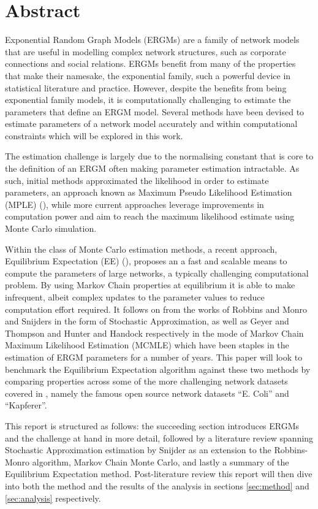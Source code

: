 \section{Abstract}

Exponential Random Graph Models (ERGMs) are a family of network models that are useful in modelling complex network structures, such as corporate connections and social relations. ERGMs benefit from many of the properties that make their namesake, the exponential family, such a powerful device in statistical literature and practice. However, despite the benefits from being exponential family models, it is computationally challenging to estimate the parameters that define an ERGM model. Several methods have been devised to estimate parameters of a network model accurately and within computational constraints which will be explored in this work.

The estimation challenge is largely due to the normalising constant that is core to the definition of an ERGM often making parameter estimation intractable. As such, initial methods approximated the likelihood in order to estimate parameters, an approach known as Maximum Pseudo Likelihood Estimation (MPLE) (\cite{straussikeda1990}), while more current approaches leverage improvements in computation power and aim to reach the maximum likelihood estimate using Monte Carlo simulation. 

Within the class of Monte Carlo estimation methods, a recent approach, Equilibrium Expectation (EE) (\cite{eqexpectation}), proposes an a fast and scalable means to compute the parameters of large networks, a typically challenging computational problem. By using Markov Chain properties at equilibrium it is able to make infrequent, albeit complex updates to the parameter values to reduce computation effort required. It follows on from the works of Robbins and Monro and Snijders in the form of Stochastic Approximation, as well as Geyer and Thompson and Hunter and Handock respectively in the mode of Markov Chain Maximum Likelihood Estimation (MCMLE) which have been staples in the estimation of ERGM parameters for a number of years. This paper will look to benchmark the Equilibrium Expectation algorithm against these two methods by comparing properties across some of the more challenging network datasets covered in \cite{hummels2012}, namely the famous open source network datasets ``E. Coli'' and ``Kapferer''. 

This report is structured as follows: the succeeding section introduces ERGMs and the challenge at hand in more detail, followed by a literature review spanning Stochastic Approximation estimation by Snijder as an extension to the Robbins-Monro algorithm, Markov Chain Monte Carlo, and lastly a summary of the Equilibrium Expectation method. Post-literature review this report will then dive into both the method and the results of the analysis in sections \ref{sec:method} and \ref{sec:analysis} respectively.
